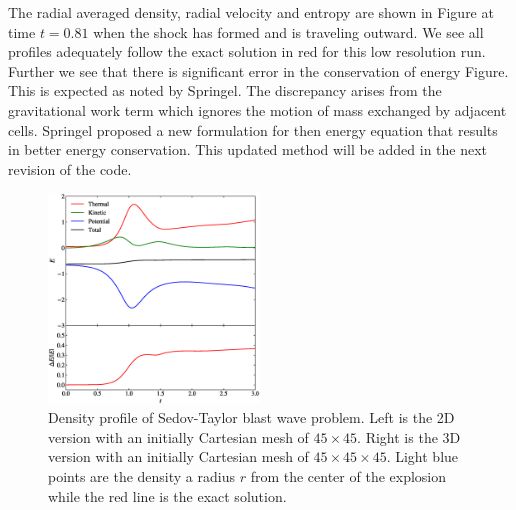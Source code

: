 The radial averaged density, radial velocity and entropy are shown in Figure at time $t=0.81$
when the shock has formed and is traveling outward. We see all profiles adequately follow the
exact solution in red for this low resolution run. Further we see that there is significant
error in the conservation of energy Figure. This is expected as noted by Springel. The 
discrepancy arises from the gravitational work term which ignores the motion of mass
exchanged by adjacent cells. Springel proposed a new formulation for then energy equation
that results in better energy conservation. This updated method will be added in the next
revision of the code.
\begin{figure}
    \begin{center}
        \includegraphics[width=0.5\textwidth]{figures/evrard_energy.eps}
        \caption{Density profile of Sedov-Taylor blast wave problem. Left is the 2D version with an initially
        Cartesian mesh of $45 \times 45$. Right is the 3D version with an initially Cartesian mesh of 
        $45 \times 45 \times 45$. Light blue points are the density a radius $r$ from the center of the explosion
        while the red line is the exact solution.}
        \label{fig.evrard_energy}
    \end{center}
\end{figure}
